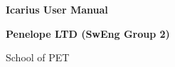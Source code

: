 \begin{titlepage}
    \begin{center}
        \null
        \vfill
        
        
        \vspace{1cm}
        \Huge
        \textbf{Icarius User Manual}
        
        \vspace{1cm}
        
        \LARGE
        \textbf{Penelope LTD (SwEng Group 2)}\\
        
        \vspace{1cm}
        
        School of PET\\
        
        
        \vspace{1cm}
        
        \dueDate
        
        \vfill
    \end{center}
\end{titlepage}